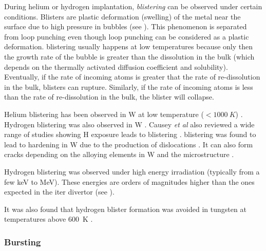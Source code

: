 During helium or hydrogen implantation, \emph{\gls{blistering}} can be observed under certain conditions.
Blisters are plastic deformation (swelling) of the metal near the surface due to high pressure in bubbles (see ).
This phenomenon is separated from \gls{loop punching} even though \gls{loop punching} can be considered as a plastic deformation.
\Gls{blistering} usually happens at low temperatures because only then the growth rate of the bubble is greater than the dissolution in the bulk (which depends on the thermally activated diffusion coefficient and solubility).
Eventually, if the rate of incoming atoms is greater that the rate of re-dissolution in the bulk, blisters can rupture.
Similarly, if the rate of incoming atoms is less than the rate of re-dissolution in the bulk, the blister will collapse.

Helium \gls{blistering} has been observed in \gls{W} at low temperature ($< \SI{1000}{K}$) .
Hydrogen \gls{blistering} was also observed in \gls{W} .
Causey \textit{et al} also reviewed a wide range of studies showing H exposure leads to \gls{blistering} .
\Gls{blistering} was found to lead to hardening in W due to the production of dislocations .
It can also form cracks depending on the alloying elements in W and the microstructure .

Hydrogen \gls{blistering} was observed under high energy irradiation (typically from a few \si{keV} to \si{MeV}).
These energies are orders of magnitudes higher than the ones expected in the \acrshort{iter} \gls{divertor} (see ).

It was also found that hydrogen blister formation was avoided in tungsten at temperatures above \SI{600}{K} .

\subsubsection{Bursting}

